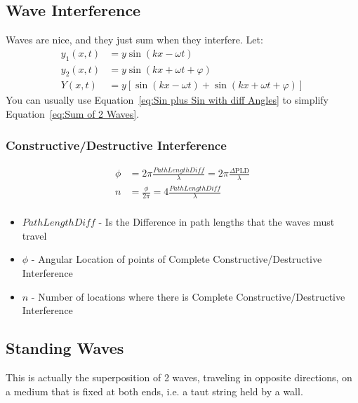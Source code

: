 \subsection{Wave Interference}\label{subsec:Wave Interference}
Waves are nice, and they just sum when they interfere. Let:
\begin{align}
  y_{1} \left( x, t \right) &= y \sin \left( kx - \omega t \right) \\
  y_{2} \left( x, t \right) &= y \sin \left( kx + \omega t + \varphi \right) \\
  Y \left( x, t \right) &= y\left[ \sin \left( kx - \omega t \right) + \sin \left( kx + \omega t + \varphi \right) \right]\label{eq:Sum of 2 Waves}
\end{align}
You can usually use Equation~\ref{eq:Sin plus Sin with diff Angles} to simplify Equation~\ref{eq:Sum of 2 Waves}.

\subsubsection{Constructive/Destructive Interference}\label{subsubsec:Constructive/Destructive Interference}
\begin{align*}
  \phi &= 2 \pi \frac{Path Length Diff}{\lambda} = 2 \pi \frac{\Delta \text{PLD}}{\lambda} \\
  n &= \frac{\phi}{2\pi} = 4 \frac{Path Length Diff}{\lambda}\\
\end{align*}
\begin{itemize}[noitemsep]
\item $Path Length Diff$ - Is the Difference in path lengths that the waves must travel
\item $\phi$ - Angular Location of points of Complete Constructive/Destructive Interference
\item $n$ - Number of locations where there is Complete Constructive/Destructive Interference
\end{itemize}

\subsection{Standing Waves}\label{subsec:Standing Waves}
This is actually the superposition of 2 waves, traveling in opposite directions, on a medium that is fixed at both ends, i.e. a taut string held by a wall.

